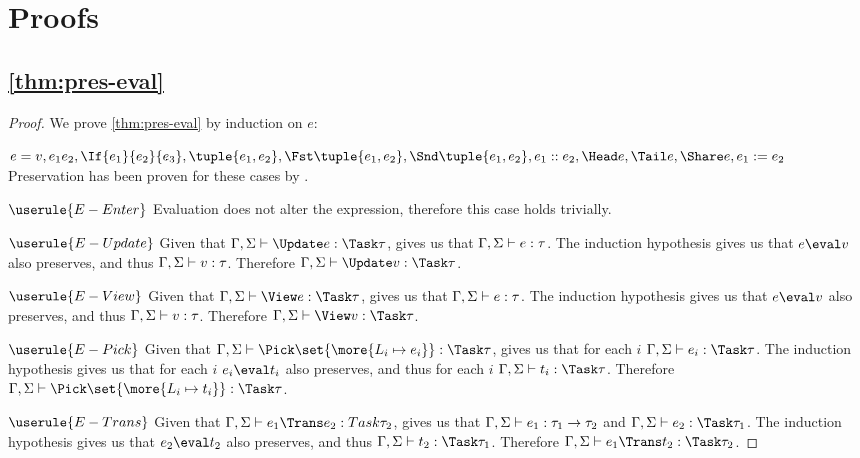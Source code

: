 
\section{Proofs}

\subsection{\cref{thm:pres-eval}}

\begin{proof}
  We prove \cref{thm:pres-eval} by induction on $e$:

  \case
    {$e=v,e_1 e_2,\If{e_1}{e_2}{e_3},\tuple{e_1, e_2},\Fst\tuple{e_1, e_2},\Snd\tuple{e_1, e_2}, e_1 :: e_2, \Head e, \Tail e,\Share e, e_1 := e_2$}
    {Preservation has been proven for these cases by \citet{DBLP:books/daglib/0005958}.}


  \case
    {$\userule{E-Enter}$}
    {Evaluation does not alter the expression, therefore this case holds trivially.}

  \case
     {$\userule{E-Update}$}
     {Given that $\Gamma,\Sigma\infers\Update e:\Task \tau$, gives us that $\Gamma,\Sigma\vdash e:\tau$.
     The induction hypothesis gives us that $e\eval v$ also preserves, and thus $\Gamma,\Sigma\vdash v:\tau$.
     Therefore $\Gamma,\Sigma\infers\Update v:\Task\tau$.}



  \case
     {$\userule{E-View}$}
     {Given that $\Gamma,\Sigma\infers \View e:\Task \tau$,  gives us that $\Gamma,\Sigma\vdash e:\tau$.
     The induction hypothesis gives us that $e\eval v$ also preserves, and thus $\Gamma,\Sigma\vdash v:\tau$.
     Therefore $\Gamma,\Sigma\infers\View v:\Task\tau$.}

  \case
    {$\userule{E-Pick}$}
    {Given that $\Gamma,\Sigma\infers \Pick\set{\more{L_i \mapsto e_i}} :\Task \tau$,  gives us that for each $i$ $\Gamma,\Sigma\infers e_i:\Task\tau$.
    The induction hypothesis gives us that for each $i$ $e_i\eval t_i$ also preserves, and thus for each $i$ $\Gamma,\Sigma\infers t_i:\Task\tau$.
    Therefore $\Gamma,\Sigma\infers \Pick\set{\more{L_i \mapsto t_i}} :\Task \tau$.}

  \case
    {$\userule{E-Trans}$}
    {Given that $\Gamma,\Sigma\infers e_1\Trans e_2:Task\tau_2$,  gives us that $\Gamma,\Sigma\vdash e_1:\tau_1\rightarrow\tau_2$ and $\Gamma,\Sigma\infers e_2:\Task \tau_1$.
    The induction hypothesis gives us that $e_2\eval t_2$ also preserves, and thus $\Gamma,\Sigma\infers t_2:\Task\tau_1$.
    Therefore $\Gamma,\Sigma\infers e_1\Trans t_2:\Task\tau_2$.}



\end{proof}
